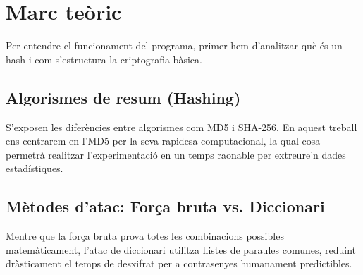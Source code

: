 \chapter{Marc teòric}
Per entendre el funcionament del programa, primer hem d'analitzar què és un hash i com s'estructura la criptografia bàsica.

\section{Algorismes de resum (Hashing)}
S'exposen les diferències entre algorismes com MD5 i SHA-256. En aquest treball ens centrarem en l'MD5 per la seva rapidesa computacional, la qual cosa permetrà realitzar l'experimentació en un temps raonable per extreure'n dades estadístiques.

\section{Mètodes d'atac: Força bruta vs. Diccionari}
Mentre que la força bruta prova totes les combinacions possibles matemàticament, l'atac de diccionari utilitza llistes de paraules comunes, reduint dràsticament el temps de desxifrat per a contrasenyes humanament predictibles.
